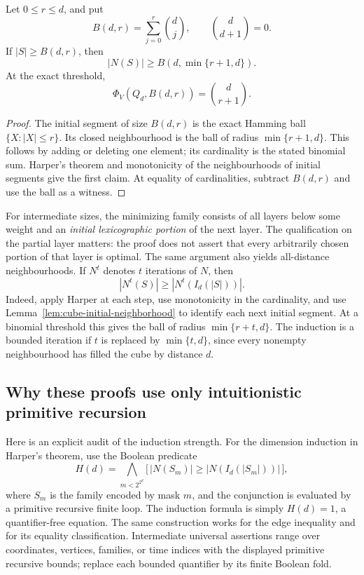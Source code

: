 \begin{corollary}
\label{cor:cube-thresholds}
Let \(0\leq r\leq d\), and put
\[
 B(d,r)=\sum_{j=0}^{r}\binom dj,
 \qquad \binom d{d+1}=0.
\]
If \(|S|\geq B(d,r)\), then
\[
 |N(S)|\geq B(d,\min\{r+1,d\}).
\]
At the exact threshold,
\[
 \Phi_V(Q_d,B(d,r))=\binom d{r+1}.
\]
\end{corollary}
\begin{proof}
The initial segment of size \(B(d,r)\) is the exact Hamming ball
\(\{X:|X|\leq r\}\).  Its closed neighbourhood is the ball of radius
\(\min\{r+1,d\}\).  This follows by adding or deleting one element;
its cardinality is the stated binomial sum.  Harper's theorem and
monotonicity of the neighbourhoods of initial segments give the first
claim.  At equality of cardinalities, subtract \(B(d,r)\) and use the
ball as a witness.
\end{proof}

For intermediate sizes, the minimizing family consists of all layers below
some weight and an \emph{initial lexicographic portion} of the next layer.
The qualification on the partial layer matters: the proof does not assert
that every arbitrarily chosen portion of that layer is optimal.
The same argument also yields all-distance neighbourhoods.  If \(N^t\)
denotes \(t\) iterations of \(N\), then
\[
 |N^t(S)|\geq |N^t(I_d(|S|))|.
\]
Indeed, apply Harper at each step, use monotonicity in the cardinality,
and use Lemma~\ref{lem:cube-initial-neighborhood} to identify each next
initial segment.  At a binomial threshold this gives the ball of radius
\(\min\{r+t,d\}\).  The induction is a bounded iteration if \(t\)
is replaced by \(\min\{t,d\}\), since every nonempty neighbourhood
has filled the cube by distance \(d\).

\subsection{Why these proofs use only intuitionistic primitive recursion}

Here is an explicit audit of the induction strength.  For the dimension
induction in Harper's theorem, use the Boolean predicate
\[
 H(d)=\bigwedge_{m<2^{2^d}}
 \bigl[\,|N(S_m)|\geq|N(I_d(|S_m|))|\,\bigr],
\]
where \(S_m\) is the family encoded by mask \(m\), and the conjunction
is evaluated by a primitive recursive finite loop.  The induction formula
is simply \(H(d)=1\), a quantifier-free equation.  The same construction
works for the edge inequality and for its equality classification.
Intermediate universal assertions range over coordinates, vertices,
families, or time indices with the displayed primitive recursive bounds;
replace each bounded quantifier by its finite Boolean fold.

